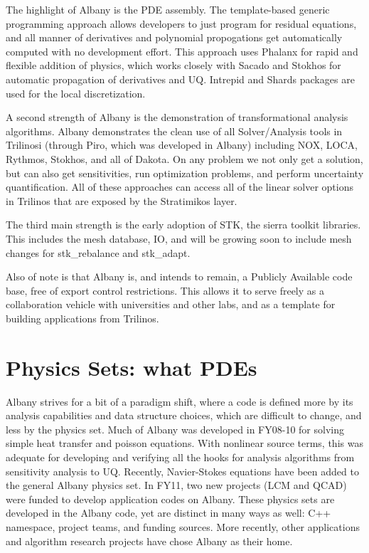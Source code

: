 \documentclass[pdf,12pt,report,strict]{SANDreport}
\theoremstyle{remark}
\begin{document}
The highlight of Albany is the PDE assembly. The template-based
generic programming approach allows developers to just program for
residual equations, and all manner of derivatives and polynomial
propogations get automatically computed with no development
effort. This approach uses Phalanx for rapid and flexible addition of
physics, which works closely with Sacado and Stokhos for automatic
propagation of derivatives and UQ. Intrepid and Shards packages are
used for the local discretization. 

A second strength of Albany is the
demonstration of transformational analysis algorithms. Albany
demonstrates the clean use of all Solver/Analysis tools in Trilinosi
(through Piro, which was developed in Albany) including NOX, LOCA,
Rythmos, Stokhos, and all of Dakota. On any problem we not only get a
solution, but can also get sensitivities, run optimization problems,
and perform uncertainty quantification. All of these approaches can
access all of the linear solver options in Trilinos that are exposed
by the Stratimikos layer. 

The third main strength is the early
adoption of STK, the sierra toolkit libraries. This includes the mesh
database, IO, and will be growing soon to include mesh changes for
stk\_rebalance and stk\_adapt.  

Also of note is that Albany is, and intends to remain, a 
Publicly Available code base, free of export control 
restrictions. This allows it to serve freely as a collaboration
vehicle with universities and other labs, and as a template
for building applications from Trilinos.

\section{Physics Sets: what PDEs}

Albany strives for a bit of a paradigm shift, where a code is defined
more by its analysis capabilities and data structure choices, which
are difficult to change, and less by the physics set. Much of Albany
was developed in FY08-10 for solving simple heat transfer and poisson
equations. With nonlinear source terms, this was adequate for
developing and verifying all the hooks for analysis algorithms from
sensitivity analysis to UQ. Recently, Navier-Stokes equations have been
added to the general Albany physics set. In FY11, two new projects
(LCM and QCAD) were funded to develop application codes on Albany. These physics sets
are developed in the Albany code, yet are distinct in many ways as
well: C++ namespace, project teams, and funding sources.  
More recently, other applications and algorithm research projects
have chose Albany as their home. 
\end{document}
